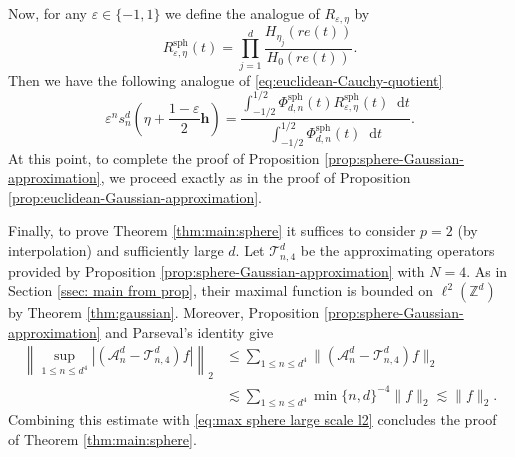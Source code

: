 \documentclass{article}
\newcommand{\dd}{\mathop{}\!\mathrm{d}}
\theoremstyle{plain}
\numberwithin{equation}{section}
\begin{document}
Now, for any $\varepsilon \in \{-1,1 \}$ we define the analogue of $ R_{\varepsilon,\eta}$ by
\[
 R_{\varepsilon,\eta}^{\textrm{sph}}(t)
 =
 \prod_{j=1}^d
 \frac{H_{\eta_j}(re(t))}{H_0(re(t))}.
\]
Then we have the following analogue of \eqref{eq:euclidean-Cauchy-quotient}
\[
\varepsilon^n s_n^d\left(\eta + \frac{1-\varepsilon}{2} \mathbf{h} \right)= \frac{\displaystyle
  \int_{-1/2}^{1/2}
 \Phi^{\textrm{sph}}_{d,n}(t) R_{\varepsilon,\eta}^{\textrm{sph}}(t) \dd t}
 {\int_{-1/2}^{1/2}
 \Phi^{\textrm{sph}}_{d,n}(t) \dd t}.
\]
At this point, to complete the proof of Proposition \ref{prop:sphere-Gaussian-approximation}, we proceed exactly as in the proof of Proposition \ref{prop:euclidean-Gaussian-approximation}. 


Finally, to prove Theorem \ref{thm:main:sphere} it suffices to consider \(p=2\) (by interpolation) and sufficiently large \(d\). Let \(\mathcal T_{n,4}^d\) be the approximating operators provided by Proposition \ref{prop:sphere-Gaussian-approximation} with \(N=4\). As in Section \ref{ssec: main from prop}, their maximal function is bounded on \(\ell^2(\mathbb Z^d)\) by Theorem \ref{thm:gaussian}. Moreover, Proposition \ref{prop:sphere-Gaussian-approximation} and Parseval’s identity give
\begin{align*}
\left\|\sup_{1\le n\le d^4}
|(\mathcal A_n^d-\mathcal T_{n,4}^d)f|\right\|_2
&\le
\sum_{1\le n\le d^4}
\|(\mathcal A_n^d-\mathcal T_{n,4}^d)f\|_2\\
&\lesssim
\sum_{1\le n\le d^4}\min\{n,d\}^{-4}
\|f\|_2
\lesssim \|f\|_2.
\end{align*}
Combining this estimate with \eqref{eq:max sphere large scale l2} concludes the proof of Theorem \ref{thm:main:sphere}.
\end{document}
